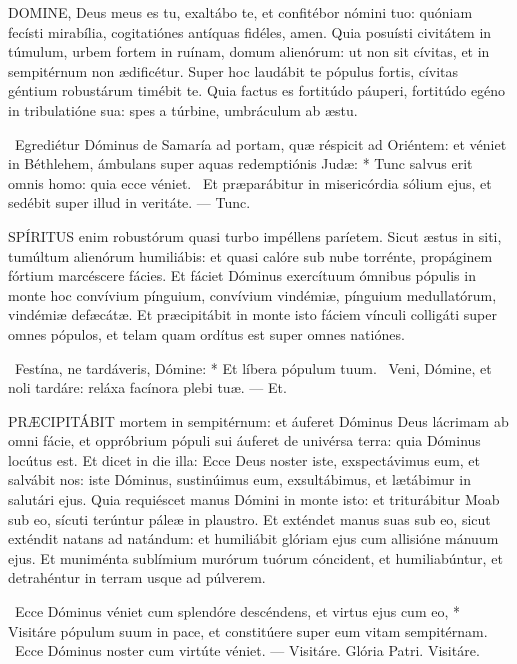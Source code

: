 \lettrine[lines=2]{D}{OMINE}, Deus meus es tu, exaltábo te, et confitébor nómini tuo: quóniam fecísti mirabília, cogitatiónes antíquas fidéles, amen. Quia posuísti civitátem in túmulum, urbem fortem in ruínam, domum alienórum: ut non sit cívitas, et in sempitérnum non ædificétur. Super hoc laudábit te pópulus fortis, cívitas géntium robustárum timébit te. Quia factus es fortitúdo páuperi, fortitúdo egéno in tribulatióne sua: spes a túrbine, umbráculum ab æstu.

\R\ Egrediétur Dóminus de Samaría ad portam, quæ réspicit ad Oriéntem: et véniet in Béthlehem, ámbulans super aquas redemptiónis Judæ: * Tunc salvus erit omnis homo: quia ecce véniet. \V\ Et præparábitur in misericórdia sólium ejus, et sedébit super illud in veritáte. --- Tunc.


\lettrine[lines=2]{S}{PÍRITUS} enim robustórum quasi turbo impéllens paríetem. Sicut æstus in siti, tumúltum alienórum humiliábis: et quasi calóre sub nube torrénte, propáginem fórtium marcéscere fácies. Et fáciet Dóminus exercítuum ómnibus pópulis in monte hoc convívium pínguium, convívium vindémiæ, pínguium medullatórum, vindémiæ defæcátæ. Et præcipitábit in monte isto fáciem vínculi colligáti super omnes pópulos, et telam quam ordítus est super omnes natiónes.

\R\ Festína, ne tardáveris, Dómine: * Et líbera pópulum tuum. \V\ Veni, Dómine, et noli tardáre: reláxa facínora plebi tuæ. --- Et.


\lettrine[lines=2]{P}{RÆCIPITÁBIT} mortem in sempitérnum: et áuferet Dóminus Deus lácrimam ab omni fácie, et oppróbrium pópuli sui áuferet de univérsa terra: quia Dóminus locútus est. Et dicet in die illa: Ecce Deus noster iste, exspectávimus eum, et salvábit nos: iste Dóminus, sustinúimus eum, exsultábimus, et lætábimur in salutári ejus. Quia requiéscet manus Dómini in monte isto: et triturábitur Moab sub eo, sícuti terúntur páleæ in plaustro. Et exténdet manus suas sub eo, sicut exténdit natans ad natándum: et humiliábit glóriam ejus cum allisióne mánuum ejus. Et muniménta sublímium murórum tuórum cóncident, et humiliabúntur, et detrahéntur in terram usque ad púlverem.

\R\ Ecce Dóminus véniet cum splendóre descéndens, et virtus ejus cum eo, * Visitáre pópulum suum in pace, et constitúere super eum vitam sempitérnam. \V\ Ecce Dóminus noster cum virtúte véniet. --- Visitáre. Glória Patri. Visitáre.

